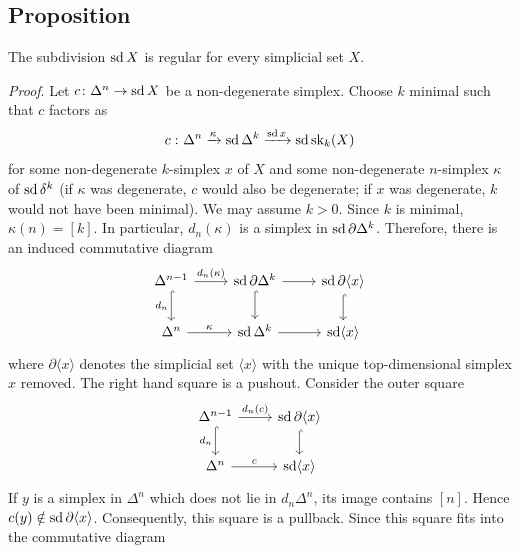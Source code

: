     \subsection{Proposition}\label{chV-5-17}
        The subdivision $\operatorname{sd} X$ is regular for every simplicial set $X$.
        \smallskip

        \emph{Proof}. Let $c \colon \Delta^n \to \operatorname{sd} X$ be a non-degenerate simplex. Choose $k$ minimal such that $c$ factors as
        \begin{equation*}
            c \,\colon \Delta^n \xrightarrow{\kappa} \operatorname{sd} \Delta^k \xrightarrow{\operatorname{sd} x} \operatorname{sd} \operatorname{sk}_k(X)
        \end{equation*}
        for some non-degenerate $k$-simplex $x$ of $X$ and some non-degenerate $n$-simplex $\kappa$ of $\operatorname{sd} \delta^k$ (if $\kappa$ was degenerate, $c$ would also be degenerate; if $x$ was degenerate, $k$ would not have been minimal). We may assume $k > 0$. Since $k$ is minimal, $\kappa(n) = [k]$. In particular, $d_n(\kappa)$ is a simplex in $\operatorname{sd} \partial \Delta^k$. Therefore, there is an induced commutative diagram
        \begin{equation*}
            \begin{tikzcd}
                \Delta^{n-1} \arrow[d, hook, "d_n"'] \arrow[r, "{d_n(\kappa)}"] & \sd \partial \Delta^k \arrow[d, hook] \arrow[r] & \sd \partial \langle x \rangle \arrow[d, hook] \\
                \Delta^n \arrow[r, "\kappa"] & \sd \Delta^k \arrow[r] & \sd \langle x \rangle
            \end{tikzcd}
        \end{equation*}
        where $\partial \langle x \rangle$ denotes the simplicial set $\langle x \rangle$ with the unique top-dimensional simplex $x$ removed. The right hand square is a pushout. Consider the outer square
        \begin{equation*}
            \begin{tikzcd}
                \Delta^{n-1} \arrow[d, hook, "d_n"'] \arrow[r, "{d_n(c)}"] & \sd \partial \langle x \rangle \arrow[d, hook] \\
                \Delta^n \arrow[r, "c"] & \sd \langle x \rangle
            \end{tikzcd}
        \end{equation*}
        If $y$ is a simplex in $\Delta^n$ which does not lie in $d_n \Delta^n$, its image contains $[n]$. Hence $c(y) \notin \operatorname{sd} \partial \langle x \rangle$. Consequently, this square is a pullback. Since this square fits into the commutative diagram
